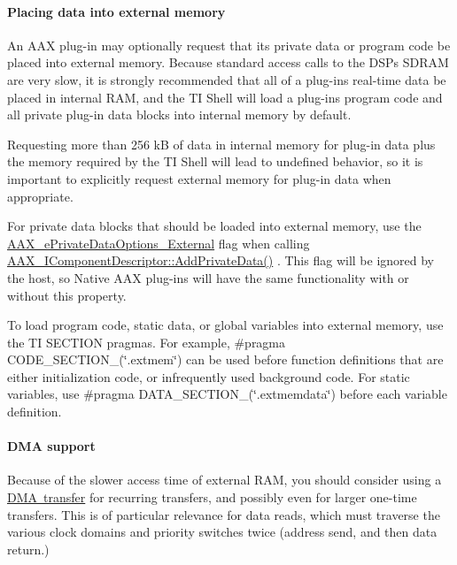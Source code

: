 \hypertarget{a00832_subsubsection__placing_data_into_external_memory_}{}\paragraph{Placing data into external memory}\label{a00832_subsubsection__placing_data_into_external_memory_}
 An A\+AX plug-\/in may optionally request that its private data or program code be placed into external memory. Because standard access calls to the D\+SP\textquotesingle{}s S\+D\+R\+AM are very slow, it is strongly recommended that all of a plug-\/in\textquotesingle{}s real-\/time data be placed in internal R\+AM, and the TI Shell will load a plug-\/in\textquotesingle{}s program code and all private plug-\/in data blocks into internal memory by default.

Requesting more than 256 kB of data in internal memory for plug-\/in data plus the memory required by the TI Shell will lead to undefined behavior, so it is important to explicitly request external memory for plug-\/in data when appropriate.

For private data blocks that should be loaded into external memory, use the \mbox{\hyperlink{a00491_a9f1ef2cb64daf30eaf145dfbb8cd0d00a75aef62fea40f9bba18502add99130b2}{A\+A\+X\+\_\+e\+Private\+Data\+Options\+\_\+\+External}} flag when calling \mbox{\hyperlink{a01781_a125949841a13e97ff93fa321f2050433}{A\+A\+X\+\_\+\+I\+Component\+Descriptor\+::\+Add\+Private\+Data()}} . This flag will be ignored by the host, so Native A\+AX plug-\/ins will have the same functionality with or without this property.

To load program code, static data, or global variables into external memory, use the {\ttfamily TI S\+E\+C\+T\+I\+ON} pragmas. For example, {\ttfamily \#pragma C\+O\+D\+E\+\_\+\+S\+E\+C\+T\+I\+O\+N\+\_\+(\char`\"{}.\+extmem\char`\"{})} can be used before function definitions that are either initialization code, or infrequently used background code. For static variables, use {\ttfamily \#pragma D\+A\+T\+A\+\_\+\+S\+E\+C\+T\+I\+O\+N\+\_\+(\char`\"{}.\+extmemdata\char`\"{})} before each variable definition.

\hypertarget{a00832_subsubsection__dma_support_}{}\paragraph{D\+M\+A support}\label{a00832_subsubsection__dma_support_}
 Because of the slower access time of external R\+AM, you should consider using a \mbox{\hyperlink{a00810}{D\+MA transfer}} for recurring transfers, and possibly even for larger one-\/time transfers. This is of particular relevance for data reads, which must traverse the various clock domains and priority switches twice (address send, and then data return.)

